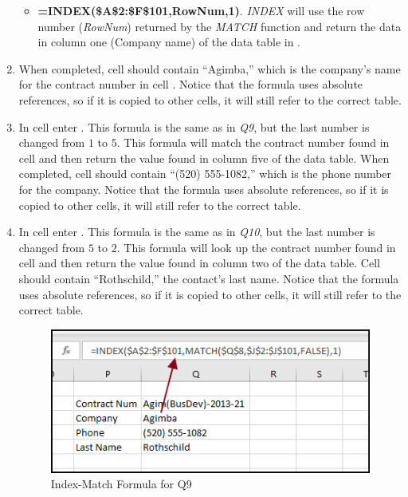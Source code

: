 \begin{enumbox}
\begin{enumerate}
\begin{itemize}
			\item \textbf{=INDEX(\$A\$2:\$F\$101,RowNum,1)}. \textit{INDEX} will use the row number (\textit{RowNum}) returned by the \textit{MATCH} function and return the data in column one (Company name) of the data table in .
		\end{itemize}
			
		\item When completed, cell  should contain ``Agimba,'' which is the company's name for the contract number in cell . Notice that the formula uses absolute references, so if it is copied to other cells, it will still refer to the correct table.

		\item In cell  enter . This formula is the same as in \textit{Q9}, but the last number is changed from $ 1 $ to $ 5 $. This formula will match the contract number found in cell  and then return the value found in column five of the data table. When completed, cell  should contain ``(520) 555-1082,'' which is the phone number for the company.  Notice that the formula uses absolute references, so if it is copied to other cells, it will still refer to the correct table. 

		\item In cell  enter . This formula is the same as in \textit{Q10}, but the last number is changed from $ 5 $ to $ 2 $. This formula will look up the contract number found in cell  and then return the value found in column two of the data table. Cell  should contain ``Rothschild,'' the contact's last name.  Notice that the formula uses absolute references, so if it is copied to other cells, it will still refer to the correct table. 
		
		\begin{figure}[H]
			\centering
			\includegraphics[width=\maxwidth{.95\linewidth}]{gfx/ch09_fig37}
			\caption{Index-Match Formula for Q9}
			\label{09:fig37}
		\end{figure}
		

\end{enumerate}
\end{enumbox}
